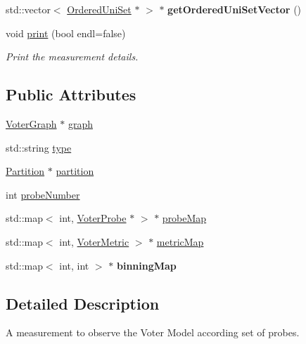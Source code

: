 \begin{DoxyCompactItemize}
\item 
\hypertarget{classVoterMeasurement_ae8315a82eb68a5ce8777d56a8840b70c}{std\-::vector$<$ \hyperlink{classOrderedUniSet}{Ordered\-Uni\-Set} $\ast$ $>$ $\ast$ {\bfseries get\-Ordered\-Uni\-Set\-Vector} ()}\label{classVoterMeasurement_ae8315a82eb68a5ce8777d56a8840b70c}

\item 
void \hyperlink{classVoterMeasurement_a9164cbbbf69d83a6ca5d8cda0951dcd5}{print} (bool endl=false)
\begin{DoxyCompactList}\small\item\em Print the measurement details. \end{DoxyCompactList}\end{DoxyCompactItemize}
\subsection*{Public Attributes}
\begin{DoxyCompactItemize}
\item 
\hyperlink{classVoterGraph}{Voter\-Graph} $\ast$ \hyperlink{classVoterMeasurement_a8d22d4b78f7e2f4c747f5716c4885351}{graph}
\item 
std\-::string \hyperlink{classVoterMeasurement_ad4471a133827f052622a84c4a451aabe}{type}
\item 
\hyperlink{classPartition}{Partition} $\ast$ \hyperlink{classVoterMeasurement_aa3879b092c573e4ba4f45531a4f57e5b}{partition}
\item 
int \hyperlink{classVoterMeasurement_a8cd0709289a4d1af82586d4b09c5a43a}{probe\-Number}
\item 
std\-::map$<$ int, \hyperlink{classVoterProbe}{Voter\-Probe} $\ast$ $>$ $\ast$ \hyperlink{classVoterMeasurement_abdee5af4a48de3334ace791912033e28}{probe\-Map}
\item 
std\-::map$<$ int, \hyperlink{voter__graph_8hpp_acb4c45a5ce4a55eee28e54e60409b9c5}{Voter\-Metric} $>$ $\ast$ \hyperlink{classVoterMeasurement_a27a9133a8ff11810c10c06b647a3ce85}{metric\-Map}
\item 
\hypertarget{classVoterMeasurement_aa1c7b4114980191441d4911d9b226de5}{std\-::map$<$ int, int $>$ $\ast$ {\bfseries binning\-Map}}\label{classVoterMeasurement_aa1c7b4114980191441d4911d9b226de5}

\end{DoxyCompactItemize}


\subsection{Detailed Description}
A measurement to observe the Voter Model according set of probes. 

